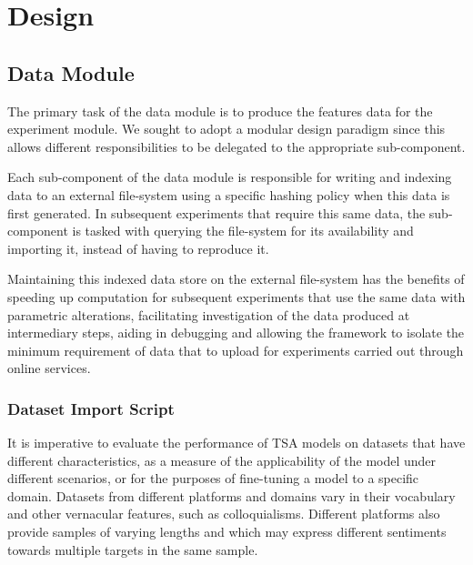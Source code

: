\documentclass[12pt, a4paper]{report}
\theoremstyle{definition}
\theoremstyle{definition}%
\theoremstyle{definition}%
\theoremstyle{definition}%
\theoremstyle{definition}%
\theoremstyle{definition}%
\begin{document}
\chapter{Design}

    

\section{Data Module}
The primary task of the data module is to produce the features data for the experiment module. We sought to adopt a modular design paradigm since this allows different responsibilities to be delegated to the appropriate sub-component. 

Each sub-component of the data module is responsible for writing and indexing data to an external file-system using a specific hashing policy when this data is first generated. In subsequent experiments that require this same data, the sub-component is tasked with querying the file-system for its availability and importing it, instead of having to reproduce it. 

Maintaining this indexed data store on the external file-system has the benefits of speeding up computation for subsequent experiments that use the same data with parametric alterations, facilitating investigation of the data produced at intermediary steps, aiding in debugging and allowing the framework to isolate the minimum requirement of data that to upload for experiments carried out through online services. 

\subsection{Dataset Import Script}
It is imperative to evaluate the performance of TSA models on datasets that have different characteristics, as a measure of the applicability of the model under different scenarios, or for the purposes of fine-tuning a model to a specific domain. Datasets from different platforms and domains vary in their vocabulary and other vernacular features, such as colloquialisms. Different platforms also provide samples of varying lengths and which may express different sentiments towards multiple targets in the same sample. 
\end{document}

